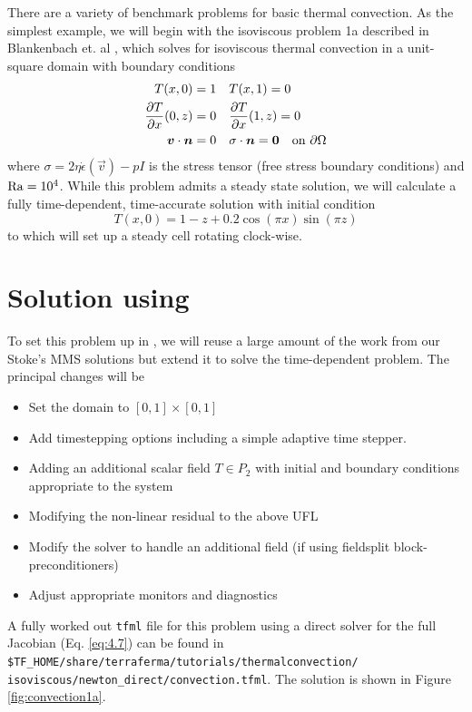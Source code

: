 There are a variety of benchmark problems for basic thermal
convection. As the simplest example, we will begin with the isoviscous
problem 1a described in Blankenbach et. al
\cite{blankenbach_benchmark_1989}, which solves for isoviscous thermal
convection in a unit-square domain with boundary conditions
\begin{align}
  \label{eq:rbconvBCs}
  T(x,0) = 1 &  \quad T(x,1) = 0\\
  \frac{\partial T}{\partial x}(0,z)=0 &  \quad\frac{\partial T}{\partial x}(1,z)=0\\
  {\mbox{\boldmath$v$}}\cdot{\mbox{\boldmath$n$}} = 0 & \quad \sigma\cdot{\mbox{\boldmath$n$}}= {\mbox{\boldmath$0$}} \quad\text{on } \partial\Omega 
\end{align}
where $\sigma = 2\eta \dot{\epsilon}(\vec{v})-pI$ is the stress tensor
(free stress boundary conditions) %
and $\mathrm{Ra}=10^{4}$.  While this problem admits a steady state solution,
we will calculate a fully time-dependent, time-accurate solution with
initial condition
\begin{displaymath}
  T(x,0) = 1 - z + 0.2\cos(\pi x)\sin(\pi z)
\end{displaymath}
to which will set up a steady cell rotating clock-wise.
\pagebreak{}
\section{Solution using \TF}
\label{sec:solution-using-tf}

To set this problem up in \TF{}, we will reuse a large amount of the
work from our Stoke's MMS solutions but extend it to solve the
time-dependent problem.  The principal changes will be
\begin{itemize}
\setlength{\itemsep}{-.1em}
\item Set the domain to  $[0,1]\times[0,1]$ 
\item Add timestepping options including a simple adaptive time stepper.
\item Adding an additional scalar field $T\in P_{2}$ with initial and
  boundary conditions appropriate  to the system
\item Modifying the non-linear residual to the above UFL
\item Modify the solver to handle an additional field (if using
  fieldsplit block-preconditioners)
\item Adjust appropriate monitors and diagnostics
\end{itemize}

A fully worked out \texttt{tfml} file for this problem using a direct
solver for the full Jacobian (Eq. \ref{eq:4.7}) %
can be found in
\texttt{\$TF\_HOME/share/terraferma/tutorials/thermalconvection/ isoviscous/newton\_direct/convection.tfml}.  The
solution is shown in Figure \ref{fig:convection1a}.   


